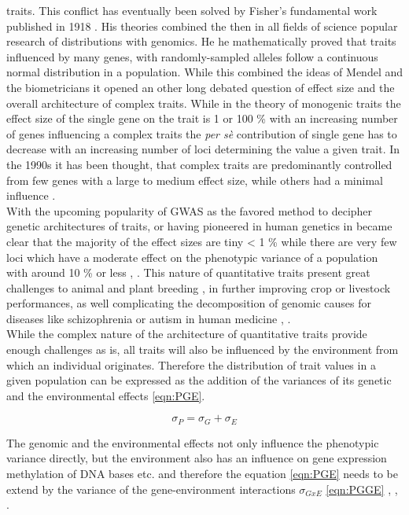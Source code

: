 traits. This conflict has eventually been solved by Fisher's fundamental work published in 1918
\cite{fisher1919xv}. His theories combined the then in all fields of science popular research of distributions
with genomics. He he mathematically proved that traits influenced by many genes, with randomly-sampled alleles
follow a continuous normal distribution in a population. While this combined the ideas of Mendel and the
biometricians it opened an other long debated question of effect size and the overall architecture of complex
traits. While in the theory of monogenic traits the effect size of the single gene on the trait is 1 or 100 \%
with an increasing number of genes influencing a complex traits the \textit{per sè} contribution of single
gene has to decrease with an increasing number of loci determining the value a given trait. In the 1990s it
has been thought, that complex traits are predominantly controlled from few genes with a large to medium
effect size, while others had a minimal influence
\cite{zhang2018esti}. \\
With the upcoming popularity of GWAS as the favored method to decipher genetic architectures of traits, or
having pioneered in human genetics in became clear that the majority of the effect sizes are tiny < 1 \% while
there are very few loci which have a moderate effect on the phenotypic variance of a population with around 10
\% or less \cite{korte2013advantages}, \cite{stringer2011}. This nature of quantitative traits present great
challenges to animal \cite{goddard2009} and plant breeding \cite{wurschum2012}, in further improving crop or
livestock performances, as well complicating the decomposition of genomic causes for diseases like
schizophrenia or autism in human medicine \cite{de2014}, \cite{purcell2014}. \\
While the complex nature of the architecture of quantitative traits provide enough challenges as is, all
traits will also be influenced by the environment from which an individual originates. Therefore the
distribution of trait values in a given population can be expressed as the addition of the variances of its
genetic and the environmental effects \ref{eqn:PGE}.

\begin{equation}
  \sigma_{P} = \sigma_{G} + \sigma_{E}
  \label{eqn:PGE}
\end{equation}

The genomic and the environmental effects not only influence the phenotypic variance directly, but the
environment also has an influence on gene expression methylation of DNA bases etc. and therefore the equation
\ref{eqn:PGE} needs to be extend by the variance of the gene-environment interactions $\sigma_{GxE}$
\ref{eqn:PGGE} , \cite{lynch1998}, \cite{walsh2018}.
        
